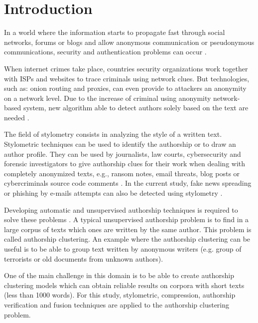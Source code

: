
\chapter{Introduction \label{sec:introduction}}

In a world where the information starts to propagate fast through social networks, forums or blogs and allow anonymous communication or pseudonymous communications, security and authentication problems can occur \cite{automated_unsupervised} \cite{kocher_pan16}.

When internet crimes take place, countries security organizations work together with ISPs and websites to trace criminals using network clues.
But technologies, such as: onion routing and proxies, can even provide to attackers an anonymity on a network level.
Due to the increase of criminal using anonymity network-based system, new algorithm able to detect authors solely based on the text are needed \cite{automated_unsupervised} \cite{attribution_in_cyberspace}.

The field of stylometry consists in analyzing the style of a written text.
Stylometric techniques can be used to identify the authorship or to draw an author profile.
They can be used by journalists, law courts, cybersecurity and forensic investigators to give authorship clues for their work when dealing with completely anonymized texts, e.g., ransom notes, email threats, blog posts or cybercriminals source code comments \cite{pan16_clustering_site}.
In the current study, fake news spreading or phishing by e-mails attempts can also be detected using stylometry \cite{unine_pan20_fake_news}.

Developing automatic and unsupervised authorship techniques is required to solve these problems \cite{automated_unsupervised}.
A typical unsupervised authorship problem is to find in a large corpus of texts which ones are written by the same author.
This problem is called authorship clustering.
An example where the authorship clustering can be useful is to be able to group text written by anonymous writers (e.g. group of terrorists or old documents from unknown authors).

One of the main challenge in this domain is to be able to create authorship clustering models which can obtain reliable results on corpora with short texts (less than 1000 words).
For this study, stylometric, compression, authorship verification and fusion techniques are applied to the authorship clustering problem.





